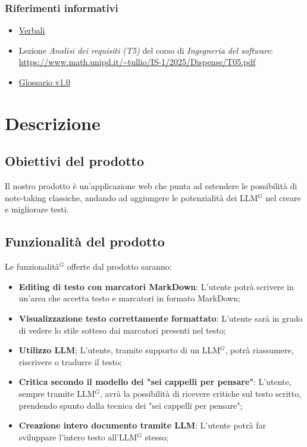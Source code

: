 \documentclass[a4paper,10pt]{article}
\def\\{ }%
\def\\{ }%
\def\\{ }%
\begin{document}
    \subsubsection{Riferimenti informativi}
    \begin{itemize}
        \item \href{https://tool-8.github.io/Documentazione-SWE/}{Verbali}
        \item Lezione \textit{Analisi dei requisiti (T5)} del corso di \textit{Ingegneria del software}: \\ \url{https://www.math.unipd.it/~tullio/IS-1/2025/Dispense/T05.pdf}
        \item \href{https://tool-8.github.io/Documentazione-SWE/glossario/Glossario.pdf}{Glossario v1.0}
    \end{itemize}

    \newpage

    \section{Descrizione}
    \subsection{Obiettivi del prodotto}
    Il nostro prodotto è un'applicazione web che punta ad estendere le possibilità
    di note-taking classiche, andando ad aggiungere le potenzialità dei LLM$^G$ nel creare e migliorare testi.
    \subsection{Funzionalità del prodotto}
    Le funzionalità$^G$ offerte dal prodotto saranno:
    \begin{itemize}
        \item \textbf{Editing di testo con marcatori MarkDown}: L'utente potrà scrivere in un'area che accetta
        testo e marcatori in formato MarkDown;
        \item \textbf{Visualizzazione testo correttamente formattato}: L'utente sarà in grado di vedere lo stile
        sotteso dai marcatori presenti nel testo;
        \item \textbf{Utilizzo LLM}; L'utente, tramite supporto di un LLM$^G$, potrà riassumere, riscrivere o tradurre il testo;
        \item \textbf{Critica secondo il modello dei "sei cappelli per pensare"}: L'utente, sempre tramite LLM$^G$, avrà
        la possibilità di ricevere critiche sul testo scritto, prendendo spunto dalla tecnica dei "sei cappelli per pensare";
        \item \textbf{Creazione intero documento tramite LLM}: L'utente potrà far sviluppare l'intero testo all'LLM$^G$ stesso;
    \end{itemize}
\end{document}
